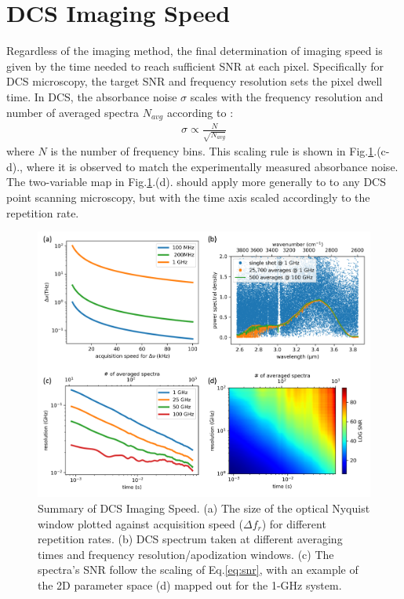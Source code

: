 \documentclass{optica-article}
\begin{document}
\section{DCS Imaging Speed}
Regardless of the imaging method, the final determination of imaging speed is given by the time needed to reach sufficient SNR at each pixel. Specifically for DCS microscopy, the target SNR and frequency resolution sets the pixel dwell time. In DCS, the absorbance noise $\sigma$ scales with the frequency resolution and number of averaged spectra $N_{avg}$ according to \cite{newbury_sensitivity_2010}: 
% 
\begin{align}
    \sigma \propto \frac{N}{\sqrt{N_{avg}}}
    \label{eq:snr}
\end{align}
% 
where $N$ is the number of frequency bins. This scaling rule is shown in \mbox{Fig.\ref{fig:snr_analysis}.(c-d).}, where it is observed to match the experimentally measured absorbance noise. The two-variable map in  \mbox{Fig.\ref{fig:snr_analysis}.(d).} should apply more generally to to any DCS point scanning microscopy, but with the time axis scaled accordingly to the repetition rate. 

\begin{figure}[h]
    \centering
    \includegraphics[width=\linewidth]{snr_analysis.png}
    \caption{Summary of DCS Imaging Speed. (a) The size of the optical Nyquist window plotted against acquisition speed ($\Delta f_r$) for different repetition rates. (b) DCS spectrum taken at different averaging times and frequency resolution/apodization windows. (c) The spectra's SNR follow the scaling of \mbox{Eq.\ref{eq:snr}}, with an example of the 2D parameter space (d) mapped out for the 1-GHz system.}
    \label{fig:snr_analysis}
\end{figure}
\end{document}
